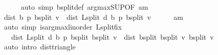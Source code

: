 \begin{isabellebody}
\ \ \ \ \isamarkupfalse%
\ {\isacharparenleft}{\kern0pt}auto\ simp{\isacharcolon}{\kern0pt}\ {\isasymL}\isactrlsub b{\isacharunderscore}{\kern0pt}split{\isacharunderscore}{\kern0pt}def{\isacharprime}{\kern0pt}\ arg{\isacharunderscore}{\kern0pt}max{\isacharunderscore}{\kern0pt}SUP{\isacharbrackleft}{\kern0pt}OF\ am{\isacharbrackright}{\kern0pt}{\isacharparenright}{\kern0pt}\isanewline
\ \ \isamarkupfalse%
\ {\isachardoublequoteopen}dist\ {\isacharparenleft}{\kern0pt}{\isasymnu}\isactrlsub b\ {\isacharquery}{\kern0pt}p{\isacharparenright}{\kern0pt}\ {\isacharparenleft}{\kern0pt}{\isasymL}\isactrlsub b{\isacharunderscore}{\kern0pt}split\ v{\isacharparenright}{\kern0pt}\ {\isacharequal}{\kern0pt}\ dist\ {\isacharparenleft}{\kern0pt}L{\isacharunderscore}{\kern0pt}split\ d\ {\isacharparenleft}{\kern0pt}{\isasymnu}\isactrlsub b\ {\isacharquery}{\kern0pt}p{\isacharparenright}{\kern0pt}{\isacharparenright}{\kern0pt}\ {\isacharparenleft}{\kern0pt}{\isasymL}\isactrlsub b{\isacharunderscore}{\kern0pt}split\ v{\isacharparenright}{\kern0pt}{\isachardoublequoteclose}\isanewline
\ \ \ \ \isamarkupfalse%
\ am\isanewline
\ \ \ \ \isamarkupfalse%
\ {\isacharparenleft}{\kern0pt}auto\ simp{\isacharcolon}{\kern0pt}\ is{\isacharunderscore}{\kern0pt}arg{\isacharunderscore}{\kern0pt}max{\isacharunderscore}{\kern0pt}linorder\ L{\isacharunderscore}{\kern0pt}split{\isacharunderscore}{\kern0pt}fix{\isacharparenright}{\kern0pt}\isanewline
\ \ \isamarkupfalse%
\ \isamarkupfalse%
\ {\isachardoublequoteopen}{\isasymdots}\ {\isasymle}\ dist\ {\isacharparenleft}{\kern0pt}L{\isacharunderscore}{\kern0pt}split\ d\ {\isacharparenleft}{\kern0pt}{\isasymnu}\isactrlsub b\ {\isacharquery}{\kern0pt}p{\isacharparenright}{\kern0pt}{\isacharparenright}{\kern0pt}\ {\isacharparenleft}{\kern0pt}{\isasymL}\isactrlsub b{\isacharunderscore}{\kern0pt}split\ {\isacharparenleft}{\kern0pt}{\isasymL}\isactrlsub b{\isacharunderscore}{\kern0pt}split\ v{\isacharparenright}{\kern0pt}{\isacharparenright}{\kern0pt}\ {\isacharplus}{\kern0pt}\ dist\ {\isacharparenleft}{\kern0pt}{\isasymL}\isactrlsub b{\isacharunderscore}{\kern0pt}split\ {\isacharparenleft}{\kern0pt}{\isasymL}\isactrlsub b{\isacharunderscore}{\kern0pt}split\ v{\isacharparenright}{\kern0pt}{\isacharparenright}{\kern0pt}\ {\isacharparenleft}{\kern0pt}{\isasymL}\isactrlsub b{\isacharunderscore}{\kern0pt}split\ v{\isacharparenright}{\kern0pt}{\isachardoublequoteclose}\isanewline
\ \ \ \ \isamarkupfalse%
\ {\isacharparenleft}{\kern0pt}auto\ intro{\isacharcolon}{\kern0pt}\ dist{\isacharunderscore}{\kern0pt}triangle{\isacharparenright}{\kern0pt}\isanewline

\end{isabellebody}
